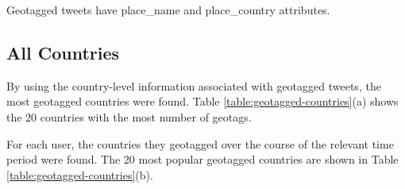 Geotagged tweets have {\selectfont place\_name} and {\selectfont place\_country} attributes. 

\subsection{All Countries}

By using the country-level information associated with geotagged tweets, the most geotagged countries were found. Table \ref{table:geotagged-countries}(a) shows the 20 countries with the most number of geotags.


For each user, the countries they geotagged over the course of the relevant time period were found. The 20 most popular geotagged countries are shown in Table \ref{table:geotagged-countries}(b).

